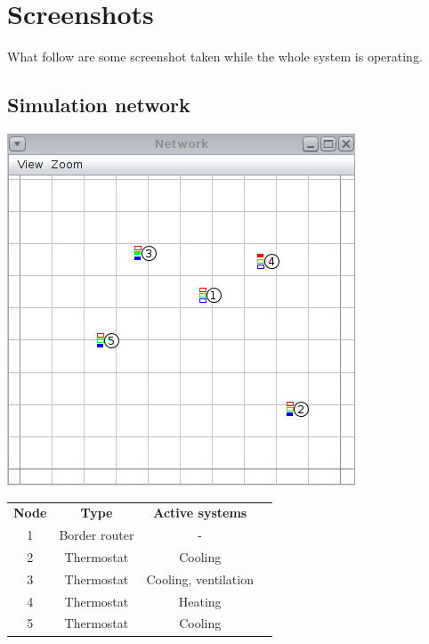 \documentclass[12pt,a4paper]{report}
\begin{document}
\section*{Screenshots}
What follow are some screenshot taken while the whole system is operating.\\[8 pt]
\subsection*{Simulation network}
\begin{minipage}{0.35\linewidth}
    \includegraphics[width=\linewidth]{images/cooja-network.png}
\end{minipage}\hfil
\begin{minipage}{0.55\linewidth}
\begin{tabular}{cccc}
\textbf{Node} & \textbf{Type} & \textbf{Active systems}\\
1 & Border router & -\\
2 & Thermostat & Cooling\\
3 & Thermostat & Cooling, ventilation\\
4 & Thermostat & Heating\\
5 & Thermostat & Cooling\\
\end{tabular}
\end{minipage}
\end{document}
